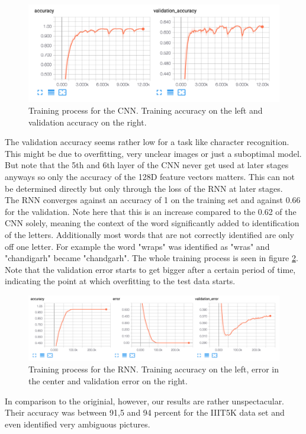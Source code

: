 \documentclass{utue} %
\begin{document}
\begin{figure}[h!]
	\centering
	\includegraphics[width=\columnwidth]{graphics/cnn_accuracy.png}
	\caption{\label{fig:cnn_accuracy}Training process for the CNN. Training accuracy on the left and validation accuracy on the right.}
\end{figure}

The validation accuracy seems rather low for a task like character recognition. This might be due to overfitting, very unclear images or just a suboptimal model. But note that the 5th and 6th layer of the CNN never get used at later stages anyways so only the accuracy of the 128D feature vectors matters. This can not be determined directly but only through the loss of the RNN at later stages. \\
The RNN converges against an accuracy of 1 on the training set and against 0.66 for the validation. Note here that this is an increase compared to the 0.62 of the CNN solely, meaning the context of the word significantly added to identification of the letters. Additionally most words that are not correctly identified are only off one letter. For example the word "wraps" was identified as "wras" and "chandigarh" became "chandgarh".%
The whole training process is seen in figure \ref{fig:rnn_accuracy}. Note that the validation error starts to get bigger after a certain period of time, indicating the point at which overfitting to the test data starts. \\

\begin{figure}[h!]
	\centering
	\includegraphics[width=\columnwidth]{graphics/rnn_accuracy.png}
	\caption{\label{fig:rnn_accuracy} Training process for the RNN. Training accuracy on the left, error in the center and validation error on the right.}
\end{figure} 
In comparison to the originial, however, our results are rather unspectacular. Their accuracy was between 91,5 and 94 percent for the IIIT5K data set and even identified very ambiguous pictures.
\end{document}
